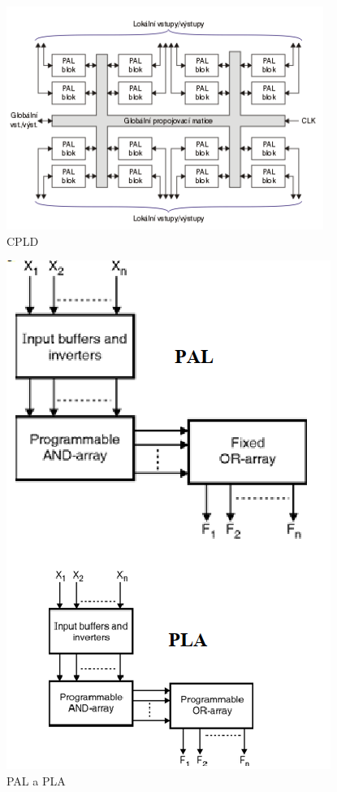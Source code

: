     \begin{figure}[h]
   \begin{center}
     \includegraphics[scale=0.4]{images/CPLD.png}
   \end{center}
   \caption{CPLD}
  \end{figure}
  
      \begin{figure}[h]
   \begin{center}
     \includegraphics[scale=0.4]{images/PAL.png}
   \end{center}
   \caption{PAL a PLA}
  \end{figure}



